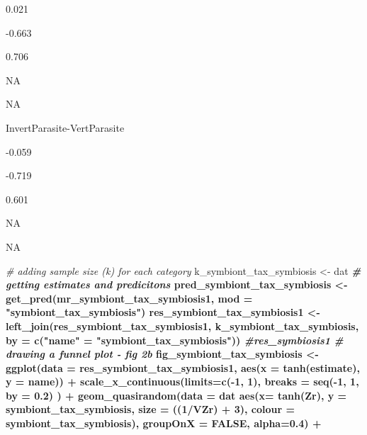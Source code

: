 \documentclass[
]{article}
\newenvironment{Shaded}{\begin{snugshade}}{\end{snugshade}}
\newcommand{\CommentTok}[1]{\textcolor[rgb]{0.56,0.35,0.01}{\textit{#1}}}
\newcommand{\DataTypeTok}[1]{\textcolor[rgb]{0.13,0.29,0.53}{#1}}
\newcommand{\DecValTok}[1]{\textcolor[rgb]{0.00,0.00,0.81}{#1}}
\newcommand{\FloatTok}[1]{\textcolor[rgb]{0.00,0.00,0.81}{#1}}
\newcommand{\KeywordTok}[1]{\textcolor[rgb]{0.13,0.29,0.53}{\textbf{#1}}}
\newcommand{\NormalTok}[1]{#1}
\newcommand{\OperatorTok}[1]{\textcolor[rgb]{0.81,0.36,0.00}{\textbf{#1}}}
\newcommand{\OtherTok}[1]{\textcolor[rgb]{0.56,0.35,0.01}{#1}}
\newcommand{\StringTok}[1]{\textcolor[rgb]{0.31,0.60,0.02}{#1}}
\begin{document}
0.021

-0.663

0.706

NA

NA

InvertParasite-VertParasite

-0.059

-0.719

0.601

NA

NA

\begin{Shaded}
\begin{Highlighting}[]
\CommentTok{# adding sample size (k) for each category}
\NormalTok{k_symbiont_tax_symbiosis <-}\StringTok{ }\NormalTok{dat }\OperatorTok{%
\CommentTok{# getting estimates and predicitons}
\NormalTok{pred_symbiont_tax_symbiosis <-}\StringTok{ }\KeywordTok{get_pred}\NormalTok{(mr_symbiont_tax_symbiosis1, }\DataTypeTok{mod =} \StringTok{"symbiont_tax_symbiosis"}\NormalTok{) }
\NormalTok{res_symbiont_tax_symbiosis1 <-}\StringTok{ }\KeywordTok{left_join}\NormalTok{(res_symbiont_tax_symbiosis1, k_symbiont_tax_symbiosis, }\DataTypeTok{by =}  \KeywordTok{c}\NormalTok{(}\StringTok{"name"}\NormalTok{ =}\StringTok{ "symbiont_tax_symbiosis"}\NormalTok{))  }\OperatorTok{%
\CommentTok{#res_symbiosis1 }
\CommentTok{# drawing a funnel plot - fig 2b}
\NormalTok{fig_symbiont_tax_symbiosis <-}\StringTok{ }\KeywordTok{ggplot}\NormalTok{(}\DataTypeTok{data =}\NormalTok{ res_symbiont_tax_symbiosis1, }\KeywordTok{aes}\NormalTok{(}\DataTypeTok{x =} \KeywordTok{tanh}\NormalTok{(estimate), }\DataTypeTok{y =}\NormalTok{ name)) }\OperatorTok{+}
\StringTok{  }\KeywordTok{scale_x_continuous}\NormalTok{(}\DataTypeTok{limits=}\KeywordTok{c}\NormalTok{(}\OperatorTok{-}\DecValTok{1}\NormalTok{, }\DecValTok{1}\NormalTok{), }\DataTypeTok{breaks =} \KeywordTok{seq}\NormalTok{(}\OperatorTok{-}\DecValTok{1}\NormalTok{, }\DecValTok{1}\NormalTok{, }\DataTypeTok{by =} \FloatTok{0.2}\NormalTok{) ) }\OperatorTok{+}
\StringTok{  }\KeywordTok{geom_quasirandom}\NormalTok{(}\DataTypeTok{data =}\NormalTok{ dat }\OperatorTok{%
                   \KeywordTok{aes}\NormalTok{(}\DataTypeTok{x=} \KeywordTok{tanh}\NormalTok{(Zr), }\DataTypeTok{y =}\NormalTok{ symbiont_tax_symbiosis, }\DataTypeTok{size =}\NormalTok{ ((}\DecValTok{1}\OperatorTok{/}\NormalTok{VZr) }\OperatorTok{+}\StringTok{ }\DecValTok{3}\NormalTok{), }\DataTypeTok{colour =}\NormalTok{ symbiont_tax_symbiosis), }\DataTypeTok{groupOnX =} \OtherTok{FALSE}\NormalTok{, }\DataTypeTok{alpha=}\FloatTok{0.4}\NormalTok{) }\OperatorTok{+}\StringTok{ }
}}}
\end{Highlighting}
\end{Shaded}
\end{document}
